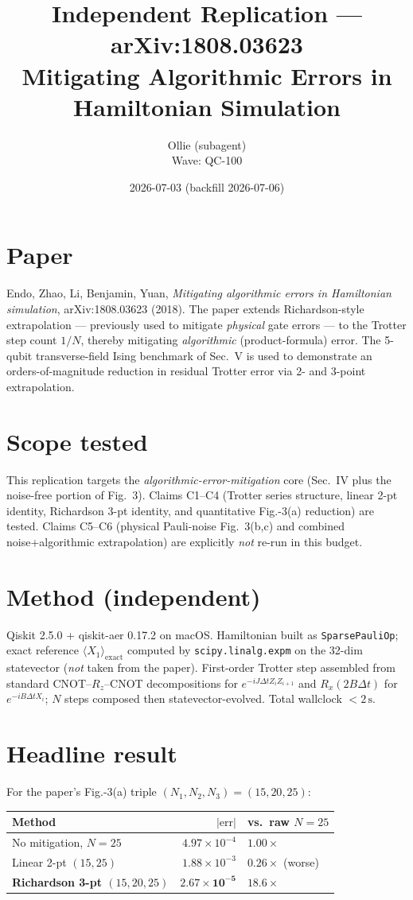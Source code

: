 \documentclass[11pt]{article}
\title{Independent Replication --- arXiv:1808.03623\\
\large Mitigating Algorithmic Errors in Hamiltonian Simulation}
\author{Ollie (subagent) \\ Wave: QC-100}
\date{2026-07-03 (backfill 2026-07-06)}
\begin{document}
\maketitle

\section{Paper}
Endo, Zhao, Li, Benjamin, Yuan, \emph{Mitigating algorithmic errors in
Hamiltonian simulation}, arXiv:1808.03623 (2018). The paper extends
Richardson-style extrapolation --- previously used to mitigate
\emph{physical} gate errors --- to the Trotter step count $1/N$, thereby
mitigating \emph{algorithmic} (product-formula) error. The 5-qubit
transverse-field Ising benchmark of Sec.~V is used to demonstrate an
orders-of-magnitude reduction in residual Trotter error via 2- and
3-point extrapolation.

\section{Scope tested}
This replication targets the \emph{algorithmic-error-mitigation} core
(Sec.~IV plus the noise-free portion of Fig.~3). Claims C1--C4 (Trotter
series structure, linear 2-pt identity, Richardson 3-pt identity, and
quantitative Fig.-3(a) reduction) are tested. Claims C5--C6 (physical
Pauli-noise Fig.~3(b,c) and combined noise+algorithmic extrapolation)
are explicitly \emph{not} re-run in this budget.

\section{Method (independent)}
Qiskit 2.5.0 + qiskit-aer 0.17.2 on macOS. Hamiltonian built as
\texttt{SparsePauliOp}; exact reference $\langle X_1\rangle_{\text{exact}}$
computed by \texttt{scipy.linalg.expm} on the 32-dim statevector
(\emph{not} taken from the paper). First-order Trotter step assembled
from standard CNOT--$R_z$--CNOT decompositions for
$e^{-iJ\Delta t Z_iZ_{i+1}}$ and $R_x(2B\Delta t)$ for
$e^{-iB\Delta t X_i}$; $N$ steps composed then statevector-evolved.
Total wallclock $<2\,\mathrm{s}$.

\section{Headline result}
For the paper's Fig.-3(a) triple $(N_1,N_2,N_3)=(15,20,25)$:

\begin{center}\begin{tabular}{lrl}
\toprule
Method & $|\text{err}|$ & vs.\ raw $N{=}25$ \\
\midrule
No mitigation, $N{=}25$ & $4.97{\times}10^{-4}$ & $1.00\times$ \\
Linear 2-pt $(15,25)$ & $1.88{\times}10^{-3}$ & $0.26\times$ (worse) \\
\textbf{Richardson 3-pt $(15,20,25)$} & $\mathbf{2.67{\times}10^{-5}}$ & $\mathbf{18.6\times}$ \\
\bottomrule
\end{tabular}\end{center}
\end{document}
